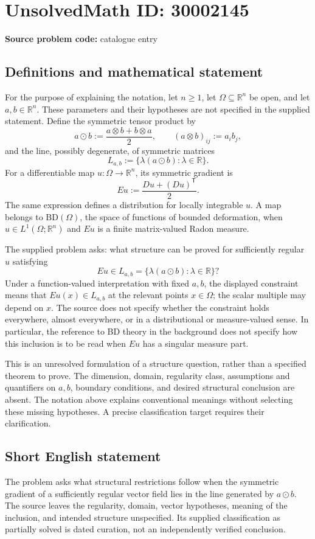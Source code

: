 \documentclass[11pt]{article}
\newcommand{\R}{\mathbb{R}}
\begin{document}
\section*{UnsolvedMath ID: 30002145}
\textbf{Source problem code:} catalogue entry
\subsection{Definitions and mathematical statement}
For the purpose of explaining the notation, let \(n\geq 1\), let \(\Omega\subseteq\R^n\) be open, and let \(a,b\in\R^n\). These parameters and their hypotheses are not specified in the supplied statement. Define the symmetric tensor product by
\[
 a\mathbin{\odot}b:=\frac{a\otimes b+b\otimes a}{2},
 \qquad (a\otimes b)_{ij}:=a_i b_j,
\]
and the line, possibly degenerate, of symmetric matrices
\[
 L_{a,b}:=\{\lambda(a\mathbin{\odot}b):\lambda\in\R\}.
\]
For a differentiable map \(u:\Omega\to\R^n\), its symmetric gradient is
\[
 Eu:=\frac{Du+(Du)^{\mathsf T}}{2}.
\]
The same expression defines a distribution for locally integrable \(u\). A map belongs to \(\mathrm{BD}(\Omega)\), the space of functions of bounded deformation, when \(u\in L^1(\Omega;\R^n)\) and \(Eu\) is a finite matrix-valued Radon measure.

The supplied problem asks: what structure can be proved for sufficiently regular \(u\) satisfying
\[
 Eu\in L_{a,b}
 =\{\lambda(a\mathbin{\odot}b):\lambda\in\R\}?
\]
Under a function-valued interpretation with fixed \(a,b\), the displayed constraint means that \(Eu(x)\in L_{a,b}\) at the relevant points \(x\in\Omega\); the scalar multiple may depend on \(x\). The source does not specify whether the constraint holds everywhere, almost everywhere, or in a distributional or measure-valued sense. In particular, the reference to BD theory in the background does not specify how this inclusion is to be read when \(Eu\) has a singular measure part.

This is an unresolved formulation of a structure question, rather than a specified theorem to prove. The dimension, domain, regularity class, assumptions and quantifiers on \(a,b\), boundary conditions, and desired structural conclusion are absent. The notation above explains conventional meanings without selecting these missing hypotheses. A precise classification target requires their clarification.
\subsection{Short English statement}
The problem asks what structural restrictions follow when the symmetric gradient of a sufficiently regular vector field lies in the line generated by \(a\mathbin{\odot}b\). The source leaves the regularity, domain, vector hypotheses, meaning of the inclusion, and intended structure unspecified. Its supplied classification as partially solved is dated curation, not an independently verified conclusion.
\end{document}
